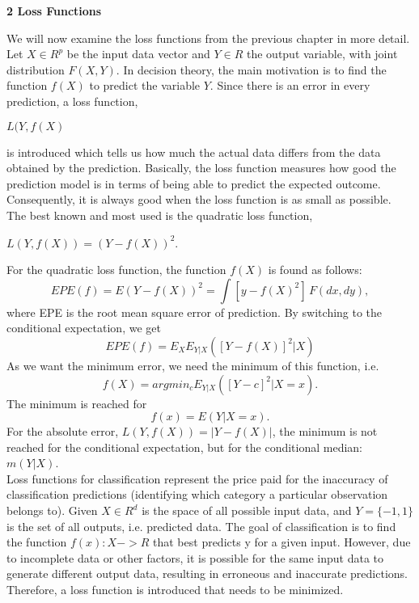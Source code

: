 \documentclass[12pt, letterpaper, twoside]{article}
\begin{document}
\begin{center}
\textbf{\large{2 Loss Functions}} 

\end{center}
We will now examine the loss functions from the previous chapter in more detail.\\
Let $X \in R^{p}$ be the input data vector and $Y \in R$ the output variable, with joint distribution $F(X,Y)$. In decision theory, the main motivation is to find the function $f(X)$ to predict the variable $Y$. Since there is an error in every prediction, a loss function,
\begin{center}
 $L(Y,f(X)$
\end{center} is introduced which tells us how much the actual data differs from the data obtained by the prediction. Basically, the loss function measures how good the prediction model is in terms of being able to predict the expected outcome. Consequently, it is always good when the loss function is as small as possible.\\
\hspace*{4ex}The best known and most used is the quadratic loss function, 
\begin{center}
$L(Y,f(X)) = (Y - f(X))^2$. 
\end{center}
For the quadratic loss function, the function $f(X)$ is found as follows:\[EPE(f) = E(Y-f(X))^2 = \int [y-f(X)^2] \,F(dx,dy),\]
where EPE is the root mean square error of prediction.
By switching to the conditional expectation, we get \[EPE(f) = E_XE_{Y|X}([Y-f(X)]^2|X)\]
As we want the minimum error, we need the minimum of this function, i.e. \[f(X)=argmin_cE_{Y|X}([Y-c]^2|X=x).\]
The minimum is reached for \[f(x)= E(Y|X=x).\]
For the absolute error, \(L(Y,f(X)) = |Y-f(X)|\), the minimum is not reached for the conditional expectation, but for the conditional median: \(m(Y|X)\).\\
\hspace*{4ex} Loss functions for classification represent the price paid for the inaccuracy of classification predictions (identifying which category a particular observation belongs to). Given $X \in R^d$ is the space of all possible input data, and $Y = \{−1, 1\}$ is the set of all outputs, i.e. predicted data. The goal of classification is to find the function $f(x) : X -> R$ that best predicts y for a given input. However, due to incomplete data or other factors, it is possible for the same input data to generate different output data, resulting in erroneous and inaccurate predictions. Therefore, a loss function is introduced that needs to be minimized.\\
\end{document}

